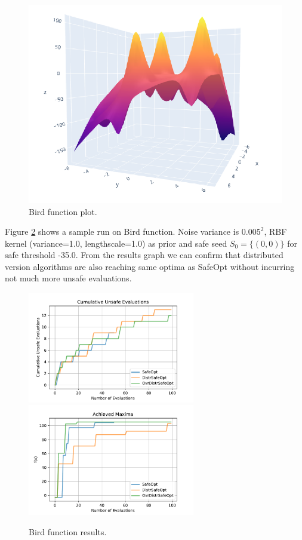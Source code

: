 \begin{figure}[H]
	\centering
	\includegraphics[scale=0.4]{figures/bird-function-plot.png}
	\caption{Bird function plot.}
	\label{fig:bird-function-plot}
\end{figure}

Figure \ref{fig:bird-result} shows a sample run on Bird function. Noise variance is $0.005^2$, RBF kernel (variance=1.0, lengthscale=1.0) as prior and safe seed $S_0=\{ (0,0) \}$ for safe threshold -35.0. From the results graph we can confirm that distributed version algorithms are also reaching same optima as SafeOpt without incurring not much more unsafe evaluations.
\begin{figure}[H]
	\centering
	\includegraphics[width=0.65\textwidth]{figures/results/bird-cum-unsafe.pdf}
	\includegraphics[width=0.65\textwidth]{figures/results/bird-maxima.pdf}
	\caption{Bird function results.}
	\label{fig:bird-result}
\end{figure}

